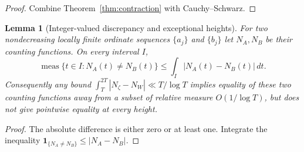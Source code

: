 \documentclass[11pt,leqno]{amsart}
\numberwithin{equation}{section}
\newtheorem{lemma}[theorem]{Lemma}
\theoremstyle{definition}
\theoremstyle{remark}
\newcommand{\1}{\mathbf 1}
\newcommand{\meas}{\operatorname{meas}}
\begin{document}
\begin{proof}
Combine Theorem~\ref{thm:contraction} with Cauchy--Schwarz.
\end{proof}
\begin{lemma}[Integer-valued discrepancy and exceptional heights]\label{lem:integers}
For two nondecreasing locally finite ordinate sequences $\{a_j\}$ and $\{b_j\}$ let $N_A,N_B$ be their counting functions. On every interval $I$,
\begin{equation}\label{eq:exception}
 \meas\{t\in I:N_A(t)\ne N_B(t)\}\le\int_I|N_A(t)-N_B(t)|\,dt.
\end{equation}
Consequently any bound $\int_T^{2T}|N_\zeta-N_W|\ll T/\log T$ implies equality of these two counting functions away from a subset of relative measure $O(1/\log T)$, but does not give pointwise equality at every height.
\end{lemma}
\begin{proof}
The absolute difference is either zero or at least one. Integrate the inequality $\1_{\{N_A\ne N_B\}}\le|N_A-N_B|$.
\end{proof}
\end{document}
